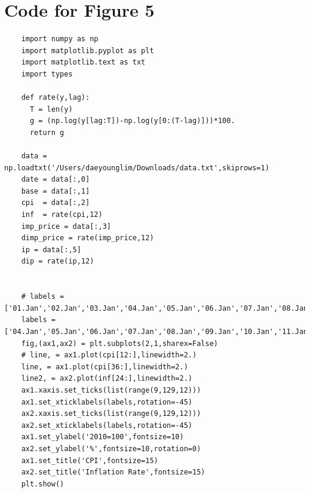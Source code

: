 \documentclass[answers]{exam}
\begin{document}
  \section{Code for Figure 5}
  \begin{lstlisting}
    import numpy as np
    import matplotlib.pyplot as plt
    import matplotlib.text as txt
    import types

    def rate(y,lag):
      T = len(y)
      g = (np.log(y[lag:T])-np.log(y[0:(T-lag)]))*100.
      return g

    data = np.loadtxt('/Users/daeyounglim/Downloads/data.txt',skiprows=1)
    date = data[:,0]
    base = data[:,1]
    cpi  = data[:,2]
    inf  = rate(cpi,12)
    imp_price = data[:,3]
    dimp_price = rate(imp_price,12)
    ip = data[:,5]
    dip = rate(ip,12)


    # labels = ['01.Jan','02.Jan','03.Jan','04.Jan','05.Jan','06.Jan','07.Jan','08.Jan','09.Jan','10.Jan','11.Jan','12.Jan','13.Jan']
    labels = ['04.Jan','05.Jan','06.Jan','07.Jan','08.Jan','09.Jan','10.Jan','11.Jan','12.Jan','13.Jan']
    fig,(ax1,ax2) = plt.subplots(2,1,sharex=False)
    # line, = ax1.plot(cpi[12:],linewidth=2.)
    line, = ax1.plot(cpi[36:],linewidth=2.)
    line2, = ax2.plot(inf[24:],linewidth=2.)
    ax1.xaxis.set_ticks(list(range(9,129,12)))
    ax1.set_xticklabels(labels,rotation=-45)
    ax2.xaxis.set_ticks(list(range(9,129,12)))
    ax2.set_xticklabels(labels,rotation=-45)
    ax1.set_ylabel('2010=100',fontsize=10)
    ax2.set_ylabel('%',fontsize=10,rotation=0)
    ax1.set_title('CPI',fontsize=15)
    ax2.set_title('Inflation Rate',fontsize=15)
    plt.show()
  \end{lstlisting}
\end{document}

